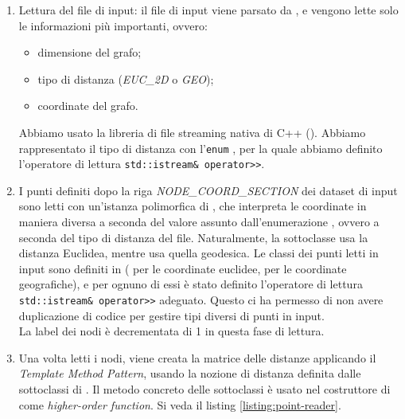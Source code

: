 \begin{enumerate}
    \item Lettura del file di input: il file di input viene parsato da , e vengono lette solo le informazioni più importanti, ovvero:

    \begin{itemize}
        \item dimensione del grafo;
        \item tipo di distanza (\textit{EUC\_2D} o \textit{GEO});
        \item coordinate del grafo.
    \end{itemize}

    \noindent Abbiamo usato la libreria di file streaming nativa di C++ (). Abbiamo rappresentato il tipo di distanza con l'\texttt{enum} , per la quale abbiamo definito l'operatore di lettura \texttt{std::istream& operator>>}.

    \item I punti definiti dopo la riga \textit{NODE\_COORD\_SECTION} dei dataset di input sono letti con un'istanza polimorfica di , che interpreta le coordinate in maniera diversa a seconda del valore assunto dall'enumerazione , ovvero a seconda del tipo di distanza del file. Naturalmente, la sottoclasse  usa la distanza Euclidea, mentre  usa quella geodesica. Le classi dei punti letti in input sono definiti in  ( per le coordinate euclidee,  per le coordinate geografiche), e per ognuno di essi è stato definito l'operatore di lettura \texttt{std::istream& operator>>} adeguato. Questo ci ha permesso di non avere duplicazione di codice per gestire tipi diversi di punti in input. \\

    \noindent La label dei nodi è decrementata di 1 in questa fase di lettura.

    \item Una volta letti i nodi, viene creata la matrice delle distanze applicando il \textit{Template Method Pattern}, usando la nozione di distanza definita dalle sottoclassi di . Il metodo concreto  delle sottoclassi è usato nel costruttore di  come \textit{higher-order function}. Si veda il listing \ref{listing:point-reader}.
\end{enumerate}

